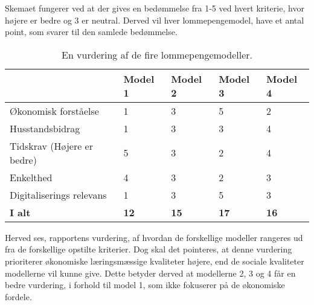 \noindent Skemaet fungerer ved at der gives en bedømmelse fra 1-5 ved hvert kriterie, hvor højere er bedre og 3 er neutral. Derved vil hver lommepengemodel, have et antal point, som svarer til den samlede bedømmelse.\\

\begin{center}
   \begin{table}[htb]
   \begin{tabular}{| l | l | l | l | l |} 
   \hline
   & \textbf{Model 1} & \textbf{Model 2} & \textbf{Model 3} & \textbf{Model 4} \\ \hline
   Økonomisk forståelse & 1 & 3 & 5 & 2 \\ \hline
   Husstandsbidrag & 1 & 3 & 3 & 4 \\ \hline
   Tidskrav (Højere er bedre) & 5 & 3 & 2 & 4 \\ \hline
   Enkelthed & 4 & 3 & 2 & 3 \\ \hline
   Digitaliserings relevans & 1 & 3 & 5 & 3 \\ \hline
   \textbf{I alt} & \textbf{12} & \textbf{15} & \textbf{17} & \textbf{16} \\ \hline
   \end{tabular}
   \caption{En vurdering af de fire lommepengemodeller.}
   \end{table}
\end{center}   

\noindent Herved ses, rapportens vurdering, af hvordan de forskellige modeller rangeres ud fra de forskellige opstilte kriterier.
Dog skal det pointeres, at denne vurdering prioriterer økonomiske læringsmæssige kvaliteter højere, end de sociale kvaliteter modellerne vil kunne give.
Dette betyder derved at modellerne 2, 3 og 4 får en bedre vurdering, i forhold til model 1, som ikke fokuserer på de økonomiske fordele. 

